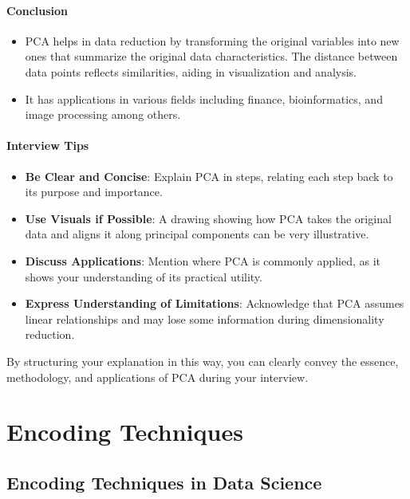 \documentclass[12pt]{book}
\providecommand{\tightlist}{%
  \setlength{\itemsep}{0pt}\setlength{\parskip}{0pt}}
\begin{document}
\subsubsection{Conclusion}\label{conclusion}

\begin{itemize}
\tightlist
\item
  PCA helps in data reduction by transforming the original variables
  into new ones that summarize the original data characteristics. The
  distance between data points reflects similarities, aiding in
  visualization and analysis.
\item
  It has applications in various fields including finance,
  bioinformatics, and image processing among others.
\end{itemize}

\subsubsection{Interview Tips}\label{interview-tips}

\begin{itemize}
\tightlist
\item
  \textbf{Be Clear and Concise}: Explain PCA in steps, relating each
  step back to its purpose and importance.
\item
  \textbf{Use Visuals if Possible}: A drawing showing how PCA takes the
  original data and aligns it along principal components can be very
  illustrative.
\item
  \textbf{Discuss Applications}: Mention where PCA is commonly applied,
  as it shows your understanding of its practical utility.
\item
  \textbf{Express Understanding of Limitations}: Acknowledge that PCA
  assumes linear relationships and may lose some information during
  dimensionality reduction.
\end{itemize}

By structuring your explanation in this way, you can clearly convey the
essence, methodology, and applications of PCA during your interview.


\chapter{Encoding Techniques}

\section{Encoding Techniques in Data Science}
\end{document}
